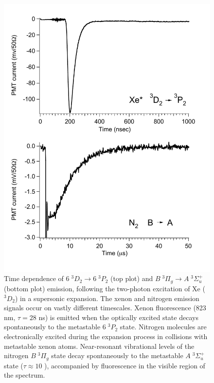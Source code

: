 \documentclass[12pt]{mitthesis}
\begin{document}
\begin{figure}
  \caption{Time dependence of  $6\;^3D_2 \rightarrow 6\;^3P_2$
    (top plot) and  $B \; ^3\Pi_g \rightarrow A \; ^3\Sigma_u^+$ (bottom
    plot) emission, following the two-photon excitation of Xe
    ($^3D_2$) in a supersonic expansion.  The xenon and nitrogen
    emission signals occur on vastly different timescales.  Xenon
    fluorescence (823 nm, $\tau=28$ ns) is emitted when the optically
    excited state decays spontaneously to the metastable $6\;^3P_2$
    state.  Nitrogen molecules are electronically excited during the
    expansion process in collisions with metastable xenon atoms.
    Near-resonant vibrational levels of the nitrogen $B \; ^3\Pi_g$
    state decay spontaneously to the metastable $A \; ^3\Sigma_u^+$
    state ($\tau \approx 10$ \microsec), accompanied by fluorescence
    in the visible region of the spectrum.}
  \label{fig:xen2-traces}
  \centering
  \includegraphics[width=5.5in]{xen2-timescales.pdf}
\end{figure}
\end{document}
